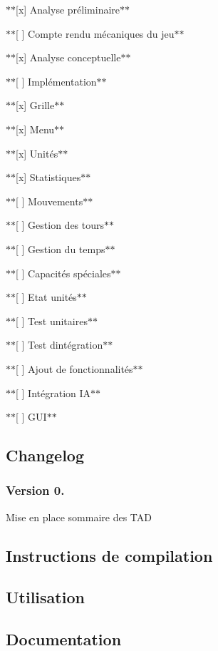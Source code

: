 \begin{DoxyItemize}
\item $\ast$$\ast$\mbox{[}x\mbox{]} Analyse préliminaire$\ast$$\ast$
\item $\ast$$\ast$\mbox{[} \mbox{]} Compte rendu mécaniques du jeu$\ast$$\ast$
\item $\ast$$\ast$\mbox{[}x\mbox{]} Analyse conceptuelle$\ast$$\ast$
\item $\ast$$\ast$\mbox{[} \mbox{]} Implémentation$\ast$$\ast$
\begin{DoxyItemize}
\item $\ast$$\ast$\mbox{[}x\mbox{]} Grille$\ast$$\ast$
\item $\ast$$\ast$\mbox{[}x\mbox{]} Menu$\ast$$\ast$
\item $\ast$$\ast$\mbox{[}x\mbox{]} Unités$\ast$$\ast$
\item $\ast$$\ast$\mbox{[}x\mbox{]} Statistiques$\ast$$\ast$
\item $\ast$$\ast$\mbox{[} \mbox{]} Mouvements$\ast$$\ast$
\item $\ast$$\ast$\mbox{[} \mbox{]} Gestion des tours$\ast$$\ast$
\item $\ast$$\ast$\mbox{[} \mbox{]} Gestion du temps$\ast$$\ast$
\item $\ast$$\ast$\mbox{[} \mbox{]} Capacités spéciales$\ast$$\ast$
\item $\ast$$\ast$\mbox{[} \mbox{]} Etat unités$\ast$$\ast$
\end{DoxyItemize}
\item $\ast$$\ast$\mbox{[} \mbox{]} Test unitaires$\ast$$\ast$
\item $\ast$$\ast$\mbox{[} \mbox{]} Test d\textquotesingle{}intégration$\ast$$\ast$
\item $\ast$$\ast$\mbox{[} \mbox{]} Ajout de fonctionnalités$\ast$$\ast$
\begin{DoxyItemize}
\item $\ast$$\ast$\mbox{[} \mbox{]} Intégration I\+A$\ast$$\ast$
\item $\ast$$\ast$\mbox{[} \mbox{]} G\+U\+I$\ast$$\ast$
\end{DoxyItemize}
\end{DoxyItemize}

\subsection*{Changelog}

\subsubsection*{Version 0.}


\begin{DoxyItemize}
\item Mise en place sommaire des T\+A\+D
\end{DoxyItemize}

\subsection*{Instructions de compilation}

\subsection*{Utilisation}

\subsection*{Documentation}